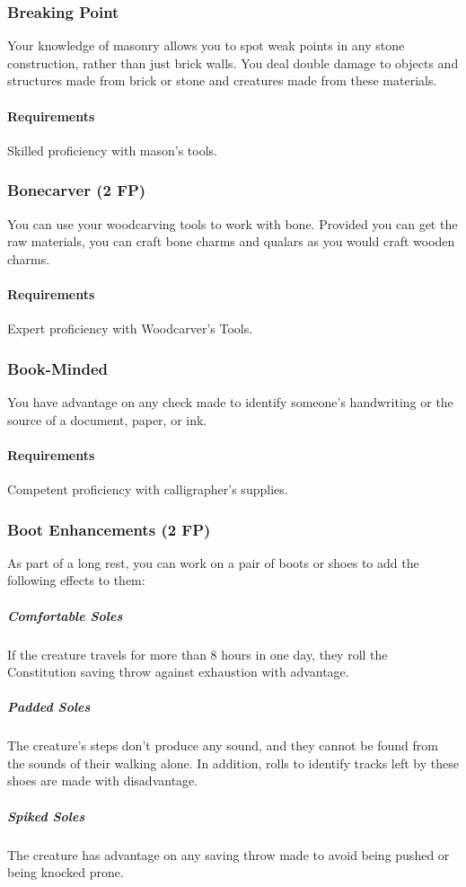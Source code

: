 \subsubsection{Breaking Point} \label{feat::breakingpoint}
    Your knowledge of masonry allows you to spot weak points in any stone construction, rather than just brick walls.
    You deal double damage to objects and structures made from brick or stone and creatures made from these materials.
    \paragraph{Requirements} Skilled proficiency with mason's tools.
\subsubsection{Bonecarver (2 FP)} \label{feat::bonecarver}
    You can use your woodcarving tools to work with bone.
    Provided you can get the raw materials, you can craft bone charms and qualars as you would craft wooden charms.
    \paragraph{Requirements} Expert proficiency with Woodcarver's Tools.
\subsubsection{Book-Minded} \label{feat::bookminded}
    You have advantage on any check made to identify someone's handwriting or the source of a document, paper, or ink.
    \paragraph{Requirements} Competent proficiency with calligrapher's supplies.
\subsubsection{Boot Enhancements (2 FP)} \label{feat::bootenhancements}
    As part of a long rest, you can work on a pair of boots or shoes to add the following effects to them:
    \subparagraph{Comfortable Soles} If the creature travels for more than 8 hours in one day, they roll the Constitution saving throw against exhaustion with advantage.
    \subparagraph{Padded Soles} The creature's steps don't produce any sound, and they cannot be found from the sounds of their walking alone.
    In addition, rolls to identify tracks left by these shoes are made with disadvantage.
    \subparagraph{Spiked Soles} The creature has advantage on any saving throw made to avoid being pushed or being knocked prone.

